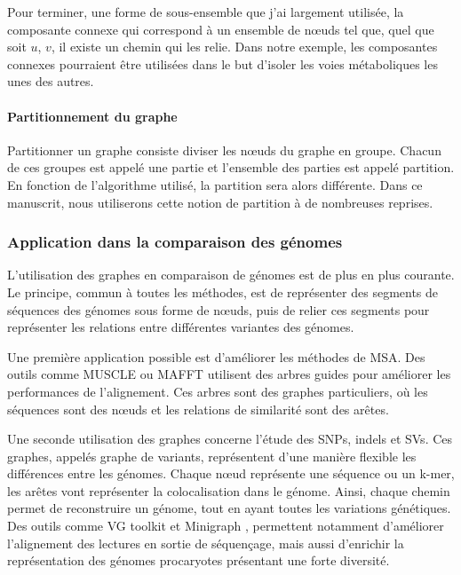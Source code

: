 Pour terminer, une forme de sous-ensemble que j'ai largement utilisée, la composante connexe qui correspond à un ensemble de n\oe uds  tel que, quel que soit $u$, $v$, il existe un chemin  qui les relie. Dans notre exemple, les composantes connexes pourraient être utilisées dans le but d'isoler les voies métaboliques les unes des autres. 

\paragraph{Partitionnement du graphe}

Partitionner un graphe consiste diviser les n\oe uds du graphe en groupe. Chacun de ces groupes est appelé une partie et l'ensemble des parties est appelé partition. En fonction de l'algorithme utilisé, la partition sera alors différente. Dans ce manuscrit, nous utiliserons cette notion de partition à  de nombreuses reprises. 

\subsubsection{Application dans la comparaison des génomes}

L'utilisation des graphes en comparaison de génomes est de plus en plus courante. Le principe, commun à toutes les méthodes, est de représenter des segments de séquences des génomes sous forme de n\oe uds, puis de relier ces segments pour représenter les relations entre différentes variantes des génomes. 


Une première application possible est d'améliorer les méthodes de MSA. Des outils comme MUSCLE ou 
MAFFT \cite{katoh_mafft_2013} utilisent des arbres guides pour améliorer les performances de l'alignement. Ces arbres sont des graphes particuliers, où les séquences sont des n\oe uds et les relations de similarité sont des arêtes.

Une seconde utilisation des graphes concerne l'étude des SNPs, indels et SVs. Ces graphes, appelés graphe de variants, représentent d'une manière flexible les différences entre les génomes. Chaque n\oe ud représente une séquence ou un k-mer, les arêtes vont représenter la colocalisation dans le génome. Ainsi, chaque chemin permet de reconstruire un génome, tout en ayant toutes les variations génétiques. Des outils comme VG toolkit \cite{garrison_variation_2018} et Minigraph \cite{li_design_2020}, permettent notamment d'améliorer l'alignement des lectures en sortie de séquençage, mais aussi d'enrichir la représentation des génomes procaryotes présentant une forte diversité.

